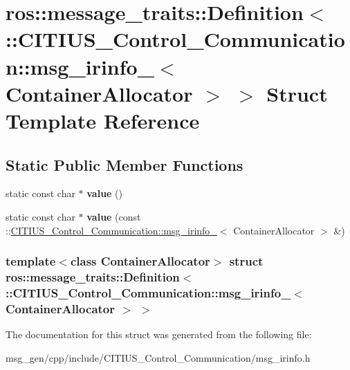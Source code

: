\hypertarget{structros_1_1message__traits_1_1_definition_3_01_1_1_c_i_t_i_u_s___control___communication_1_1ms47bf31f9e30c2dd6e134774980d287de}{\section{ros\-:\-:message\-\_\-traits\-:\-:\-Definition$<$ \-:\-:\-C\-I\-T\-I\-U\-S\-\_\-\-Control\-\_\-\-Communication\-:\-:msg\-\_\-irinfo\-\_\-$<$ \-Container\-Allocator $>$ $>$ \-Struct \-Template \-Reference}
\label{structros_1_1message__traits_1_1_definition_3_01_1_1_c_i_t_i_u_s___control___communication_1_1ms47bf31f9e30c2dd6e134774980d287de}
}
\subsection*{\-Static \-Public \-Member \-Functions}
\begin{DoxyCompactItemize}
\item 
\hypertarget{structros_1_1message__traits_1_1_definition_3_01_1_1_c_i_t_i_u_s___control___communication_1_1ms47bf31f9e30c2dd6e134774980d287de_a6741618b6e268f5dbefcd975f66bc32c}{static const char $\ast$ {\bfseries value} ()}\label{structros_1_1message__traits_1_1_definition_3_01_1_1_c_i_t_i_u_s___control___communication_1_1ms47bf31f9e30c2dd6e134774980d287de_a6741618b6e268f5dbefcd975f66bc32c}

\item 
\hypertarget{structros_1_1message__traits_1_1_definition_3_01_1_1_c_i_t_i_u_s___control___communication_1_1ms47bf31f9e30c2dd6e134774980d287de_ab1e3a1f3f2c39adf33fd71d175b889bc}{static const char $\ast$ {\bfseries value} (const \-::\hyperlink{struct_c_i_t_i_u_s___control___communication_1_1msg__irinfo__}{\-C\-I\-T\-I\-U\-S\-\_\-\-Control\-\_\-\-Communication\-::msg\-\_\-irinfo\-\_\-}$<$ \-Container\-Allocator $>$ \&)}\label{structros_1_1message__traits_1_1_definition_3_01_1_1_c_i_t_i_u_s___control___communication_1_1ms47bf31f9e30c2dd6e134774980d287de_ab1e3a1f3f2c39adf33fd71d175b889bc}

\end{DoxyCompactItemize}
\subsubsection*{template$<$class Container\-Allocator$>$ struct ros\-::message\-\_\-traits\-::\-Definition$<$ \-::\-C\-I\-T\-I\-U\-S\-\_\-\-Control\-\_\-\-Communication\-::msg\-\_\-irinfo\-\_\-$<$ Container\-Allocator $>$ $>$}



\-The documentation for this struct was generated from the following file\-:\begin{DoxyCompactItemize}
\item 
msg\-\_\-gen/cpp/include/\-C\-I\-T\-I\-U\-S\-\_\-\-Control\-\_\-\-Communication/msg\-\_\-irinfo.\-h\end{DoxyCompactItemize}
